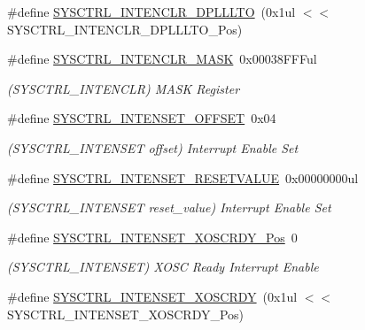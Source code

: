 \begin{DoxyCompactItemize}
\#define \mbox{\hyperlink{group___s_a_m_d21___s_y_s_c_t_r_l_gaf8ecd82f2264ef1cdd91ebd74516b8a1}{S\+Y\+S\+C\+T\+R\+L\+\_\+\+I\+N\+T\+E\+N\+C\+L\+R\+\_\+\+D\+P\+L\+L\+L\+TO}}~(0x1ul $<$$<$ S\+Y\+S\+C\+T\+R\+L\+\_\+\+I\+N\+T\+E\+N\+C\+L\+R\+\_\+\+D\+P\+L\+L\+L\+T\+O\+\_\+\+Pos)
\item 
\#define \mbox{\hyperlink{group___s_a_m_d21___s_y_s_c_t_r_l_ga686c20237044e0da5817c62137232492}{S\+Y\+S\+C\+T\+R\+L\+\_\+\+I\+N\+T\+E\+N\+C\+L\+R\+\_\+\+M\+A\+SK}}~0x00038\+F\+F\+Ful
\begin{DoxyCompactList}\small\item\em (S\+Y\+S\+C\+T\+R\+L\+\_\+\+I\+N\+T\+E\+N\+C\+LR) M\+A\+SK Register \end{DoxyCompactList}\item 
\#define \mbox{\hyperlink{group___s_a_m_d21___s_y_s_c_t_r_l_ga26a9a7a8d1669f63f2c176cb05e0a3ce}{S\+Y\+S\+C\+T\+R\+L\+\_\+\+I\+N\+T\+E\+N\+S\+E\+T\+\_\+\+O\+F\+F\+S\+ET}}~0x04
\begin{DoxyCompactList}\small\item\em (S\+Y\+S\+C\+T\+R\+L\+\_\+\+I\+N\+T\+E\+N\+S\+ET offset) Interrupt Enable Set \end{DoxyCompactList}\item 
\#define \mbox{\hyperlink{group___s_a_m_d21___s_y_s_c_t_r_l_ga380a6ac8f7870f260c76c3101e9ab7a7}{S\+Y\+S\+C\+T\+R\+L\+\_\+\+I\+N\+T\+E\+N\+S\+E\+T\+\_\+\+R\+E\+S\+E\+T\+V\+A\+L\+UE}}~0x00000000ul
\begin{DoxyCompactList}\small\item\em (S\+Y\+S\+C\+T\+R\+L\+\_\+\+I\+N\+T\+E\+N\+S\+ET reset\+\_\+value) Interrupt Enable Set \end{DoxyCompactList}\item 
\#define \mbox{\hyperlink{group___s_a_m_d21___s_y_s_c_t_r_l_gadf9060a3c8dd98da0293bc2769793cfc}{S\+Y\+S\+C\+T\+R\+L\+\_\+\+I\+N\+T\+E\+N\+S\+E\+T\+\_\+\+X\+O\+S\+C\+R\+D\+Y\+\_\+\+Pos}}~0
\begin{DoxyCompactList}\small\item\em (S\+Y\+S\+C\+T\+R\+L\+\_\+\+I\+N\+T\+E\+N\+S\+ET) X\+O\+SC Ready Interrupt Enable \end{DoxyCompactList}\item 
\#define \mbox{\hyperlink{group___s_a_m_d21___s_y_s_c_t_r_l_gaee93ebe3066d11e340cc0d6243a9fe4a}{S\+Y\+S\+C\+T\+R\+L\+\_\+\+I\+N\+T\+E\+N\+S\+E\+T\+\_\+\+X\+O\+S\+C\+R\+DY}}~(0x1ul $<$$<$ S\+Y\+S\+C\+T\+R\+L\+\_\+\+I\+N\+T\+E\+N\+S\+E\+T\+\_\+\+X\+O\+S\+C\+R\+D\+Y\+\_\+\+Pos)
\item 

\end{DoxyCompactItemize}
